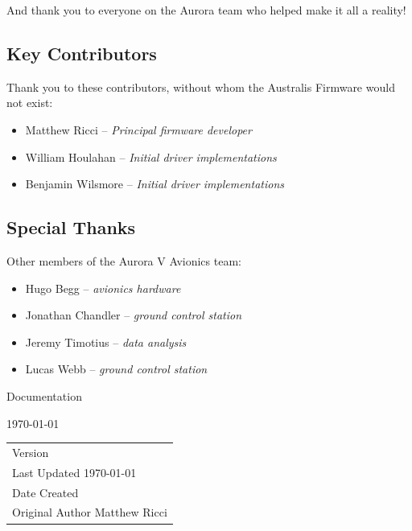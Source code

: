 \documentclass[a4paper, oneside, british]{memoir}
\makeatletter
\newcommand{\docname}{}
\newcommand{\sysname}{}
\newcommand{\orglabel}{}
\newlength{\margindedent}
\numberwithin{figure}{section}
\newcommand*{\titleAM}[2]%
{\begingroup
  \centering
  {\Huge #1 Documentation}\par\vspace{1em}
  {\huge #2}\par\vspace{1em}
  {\small {\DTMsetdatestyle{yearonly}\today} \orglabel}\par
  \endgroup}
\newcommand*{\documentInfo}[2]%
{\begingroup
  \centering
  \begin{table}[h]
  \centering
  \begin{tabularx}{0.5\textwidth}{@{}X@{}}
    Version         \dotfill #1            \\
    Last Updated    \dotfill \today        \\
    Date Created    \dotfill #2            \\
    Original Author \dotfill Matthew Ricci 
  \end{tabularx}
  \end{table}
  \endgroup}
\makeatother
\begin{document}
  And thank you to everyone on the Aurora team who helped make it all a reality!

  \subsection*{\hspace{-\margindedent}Key Contributors}
  Thank you to these contributors, without whom the Australis Firmware would not exist:
  \vspace{-0.5em}
  \begin{itemize}
    \setlength{\itemindent}{2em}
    \item Matthew Ricci     -- \textit{Principal firmware developer}
    \item William Houlahan  -- \textit{Initial driver implementations}
    \item Benjamin Wilsmore -- \textit{Initial driver implementations}
  \end{itemize}

  \subsection*{\hspace{-\margindedent}Special Thanks}
  Other members of the Aurora V Avionics team:
  \vspace{-0.5em}
  \begin{itemize}[]
    \setlength{\itemindent}{2em}
    \item Hugo Begg -- \textit{avionics hardware}
    \item Jonathan Chandler -- \textit{ground control station}
    \item Jeremy Timotius -- \textit{data analysis}
    \item Lucas Webb -- \textit{ground control station}
  \end{itemize}

  \vspace*{\fill}

  \clearpage


  
  \vspace*{\fill}
  
  \titleAM{\sysname}{\docname}
  \documentInfo{1.0}{\DTMdate{2025-03-16}}
\end{document}
